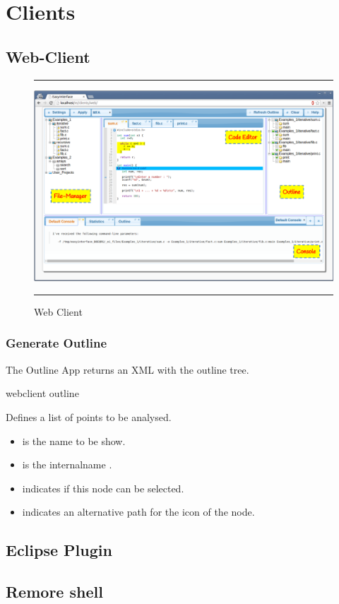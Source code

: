 {%
}

\chapter{\ei Clients}
\label{ch:clients}


\section{Web-Client}
\label{ch:clients:web}

\begin{figure}[t]
\hrule\smallskip
\begin{center}
\includegraphics[width=1\textwidth]{fig/webclient.pdf}
\end{center}
\caption{\ei Web Client}
\label{fig:webclient}
\hrule
\end{figure}


\subsection{Generate Outline}
\label{ch:clients:web:outline}

The Outline App returns an XML with the outline tree.

\bigskip
\xmlstruct
{webclient}
{outline}
{
%
  Defines a list of points to be analysed.
\begin{itemize}
  \item {} is the name to be show.
   \item {} is the internalname .
\item {} indicates if this node can be
  selected.
\item {} indicates an alternative path for the icon
  of the node.

\end{itemize}
%
}





\section{Eclipse Plugin}
\label{ch:clients:eclipse}

\section{Remore shell}
\label{ch:clients:shell}
